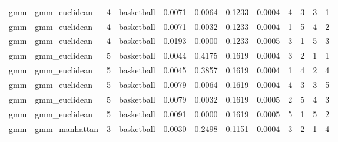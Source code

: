 \documentclass[
]{article}
\begin{document}
\begin{longtable}{| p{1.1cm} | p{2cm} | p{0.8cm} | p{1.3cm} | p{0.60cm} | p{0.7cm} | p{0.65cm} | p{0.65cm} | p{0.65cm} | p{0.65cm} | p{0.7cm} | p{0.65cm} |}
\scriptsize     gmm   & \scriptsize   gmm\_euclidean & \scriptsize    4     & \scriptsize basketball & \scriptsize    0.0071  &  \scriptsize 0.0064 &  \scriptsize 0.1233 & \scriptsize    0.0004 &   \scriptsize    4 &  \scriptsize    3 &  \scriptsize    3 &  \scriptsize    1 \\
\scriptsize     gmm   & \scriptsize   gmm\_euclidean & \scriptsize    4     & \scriptsize basketball & \scriptsize    0.0071   & \scriptsize 0.0032 &  \scriptsize 0.1233 & \scriptsize    0.0004 &   \scriptsize    1 &  \scriptsize    5  & \scriptsize    4  & \scriptsize    2 \\
\scriptsize     gmm   & \scriptsize   gmm\_euclidean & \scriptsize    4     & \scriptsize basketball & \scriptsize    0.0193   & \scriptsize 0.0000 &  \scriptsize 0.1233 & \scriptsize    0.0005 &   \scriptsize    3 &  \scriptsize    1 &  \scriptsize    5 &  \scriptsize    3 \\
\cline{3-12}
\scriptsize     gmm   & \scriptsize   gmm\_euclidean & \scriptsize    5     & \scriptsize basketball & \scriptsize    0.0044   & \scriptsize 0.4175 &  \scriptsize 0.1619 & \scriptsize    0.0004 &   \scriptsize    3 &  \scriptsize    2  & \scriptsize    1  & \scriptsize    1 \\
\scriptsize     gmm   & \scriptsize    gmm\_euclidean & \scriptsize    5    & \scriptsize basketball & \scriptsize    0.0045  &  \scriptsize 0.3857 & \scriptsize 0.1619 & \scriptsize    0.0004 & \scriptsize   1  & \scriptsize    4  & \scriptsize    2  & \scriptsize    4 \\
\scriptsize     gmm   & \scriptsize    gmm\_euclidean & \scriptsize    5    & \scriptsize basketball & \scriptsize    0.0079  &  \scriptsize 0.0064 & \scriptsize 0.1619 & \scriptsize    0.0004 & \scriptsize   4  & \scriptsize    3  & \scriptsize    3  & \scriptsize    5 \\
\scriptsize     gmm   & \scriptsize    gmm\_euclidean & \scriptsize    5    & \scriptsize basketball & \scriptsize    0.0079  &  \scriptsize 0.0032 & \scriptsize 0.1619 & \scriptsize    0.0005 & \scriptsize   2  & \scriptsize    5  & \scriptsize    4  & \scriptsize    3 \\
\scriptsize     gmm   & \scriptsize    gmm\_euclidean & \scriptsize    5    & \scriptsize basketball & \scriptsize    0.0091  &  \scriptsize 0.0000 & \scriptsize 0.1619 & \scriptsize    0.0005 & \scriptsize   5  & \scriptsize    1  & \scriptsize    5  & \scriptsize    2 \\
\cline{2-12}
\scriptsize     gmm   & \scriptsize    gmm\_manhattan & \scriptsize    3    & \scriptsize basketball & \scriptsize    0.0030  &  \scriptsize 0.2498 & \scriptsize 0.1151 & \scriptsize    0.0004 & \scriptsize   3  & \scriptsize    2  & \scriptsize    1  & \scriptsize    4 \\

\end{longtable}
\end{document}
